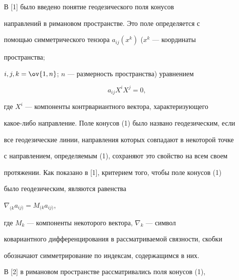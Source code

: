 \pagestyle{plain} %


 




\maketitle 


\label{begin} 


 


 


В [1] было введено понятие геодезического поля конусов 


направлений в римановом пространстве. Это поле определяется с 


помощью симметрического тензора $a_{ij}(x^k)$ ($x^k$ --- координаты 


пространства; 


$i,j,k=\ov{1,n}$; $n$ --- размерность пространства) уравнением 


\begin{equation} 


a_{ij}X^i X^j=0, 


\end{equation} 


где $X^i$ --- компоненты контрвариантного вектора, характеризующего 


какое-либо направление. Поле конусов (1) было названо геодезическим, если 


все геодезические линии, направления которых совпадают в некоторой точке 


с направлением, определяемым (1), сохраняют это свойство на всем своем 


протяжении. Как показано в [1], критерием того, чтобы поле конусов (1) 


было геодезическим, являются равенства 


$\nabla_{(k}a_{ij)}=M_{(k}a_{ij)}$, 


где $M_k$ --- компоненты некоторого вектора, $\nabla_k$ --- символ 


ковариантного дифференцирования в рассматриваемой связности, скобки 


обозначают симметрирование по индексам, содержащимся в них. 


 


В [2] в римановом пространстве рассматривались поля конусов (1), 


